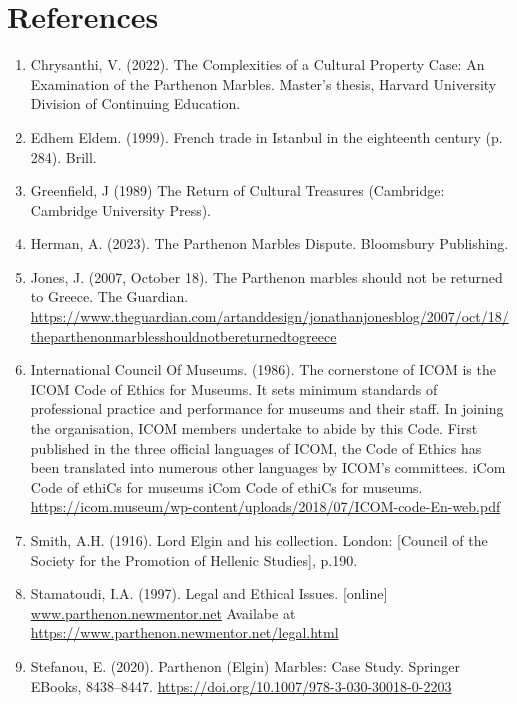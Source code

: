 \documentclass[12pt, letterpaper]{article}
\begin{document}
\section*{\huge\textbf{References}}
\begin{enumerate}

    \item Chrysanthi, V. (2022). The Complexities of a Cultural Property Case: An Examination of the Parthenon Marbles. Master's thesis, Harvard University Division of Continuing Education.

    \item Edhem Eldem. (1999). French trade in Istanbul in the eighteenth century (p. 284). Brill.

    \item Greenfield, J (1989) The Return of Cultural Treasures (Cambridge: Cambridge University Press). 
    
    \item Herman, A. (2023). The Parthenon Marbles Dispute. Bloomsbury Publishing.

    \item Jones, J. (2007, October 18). The Parthenon marbles should not be returned to Greece. The Guardian. \url{https://www.theguardian.com/artanddesign/jonathanjonesblog/2007/oct/18/theparthenonmarblesshouldnotbereturnedtogreece} \sloppy
    
    
    \item International Council Of Museums. (1986). The cornerstone of ICOM is the ICOM Code of Ethics for Museums. It sets minimum standards of professional practice and performance for museums and their staff. In joining the organisation, ICOM members undertake to abide by this Code. First published in the three official languages of ICOM, the Code of Ethics has been translated into numerous other languages by ICOM’s committees. iCom Code of ethiCs for museums iCom Code of ethiCs for museums. \url{https://icom.museum/wp-content/uploads/2018/07/ICOM-code-En-web.pdf}

    \item Smith, A.H. (1916). Lord Elgin and his collection. London: [Council of the Society for the Promotion of Hellenic Studies], p.190. 

    \item Stamatoudi, I.A. (1997). Legal and Ethical Issues. [online] 
    \url{ www.parthenon.newmentor.net}
     Availabe at \url{https://www.parthenon.newmentor.net/legal.html}
     
    \item Stefanou, E. (2020). Parthenon (Elgin) Marbles: Case Study. Springer EBooks, 8438–8447. \url{https://doi.org/10.1007/978-3-030-30018-0-2203}

\end{enumerate}
\end{document}
